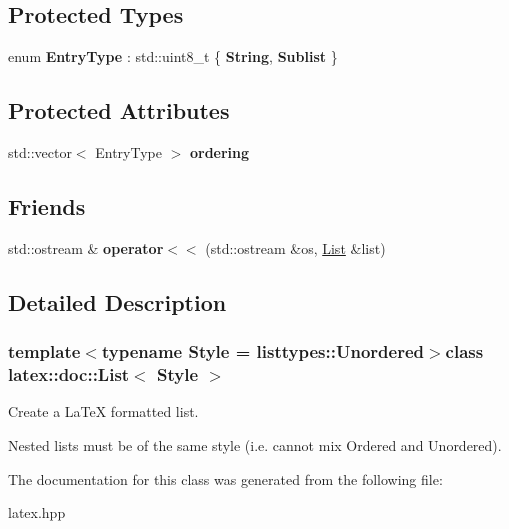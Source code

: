 \subsection*{Protected Types}
\begin{DoxyCompactItemize}
\item 
enum {\bfseries Entry\-Type} \-: std\-::uint8\-\_\-t \{ {\bfseries String}, 
{\bfseries Sublist}
 \}
\end{DoxyCompactItemize}
\subsection*{Protected Attributes}
\begin{DoxyCompactItemize}
\item 
\hypertarget{classlatex_1_1doc_1_1List_ae8e20e36cd4a198bd9062d5fe7578f00}{std\-::vector$<$ Entry\-Type $>$ {\bfseries ordering}}\label{classlatex_1_1doc_1_1List_ae8e20e36cd4a198bd9062d5fe7578f00}

\end{DoxyCompactItemize}
\subsection*{Friends}
\begin{DoxyCompactItemize}
\item 
\hypertarget{classlatex_1_1doc_1_1List_a9cf2b64b3af2172b2feedf0b75bda63d}{std\-::ostream \& {\bfseries operator$<$$<$} (std\-::ostream \&os, \hyperlink{classlatex_1_1doc_1_1List}{List} \&list)}\label{classlatex_1_1doc_1_1List_a9cf2b64b3af2172b2feedf0b75bda63d}

\end{DoxyCompactItemize}


\subsection{Detailed Description}
\subsubsection*{template$<$typename Style = listtypes\-::\-Unordered$>$class latex\-::doc\-::\-List$<$ Style $>$}

Create a La\-Te\-X formatted list.

Nested lists must be of the same style (i.\-e. cannot mix Ordered and Unordered). 

The documentation for this class was generated from the following file\-:\begin{DoxyCompactItemize}
\item 
latex.\-hpp\end{DoxyCompactItemize}
